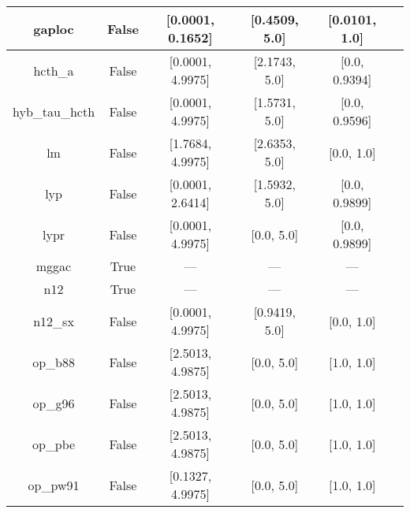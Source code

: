 \begin{tabular}{|c|c|c|c|c|l|}
         gaploc &                 False &  [0.0001, 0.1652] &     [0.4509, 5.0] &     [0.0101, 1.0] &                                         \cite{Fabiano2014_2016} \\ \hline
        hcth\_a &                 False &  [0.0001, 4.9975] &     [2.1743, 5.0] &     [0.0, 0.9394] &                                       \cite{Hamprecht1998_6264} \\ \hline
 hyb\_tau\_hcth &                 False &  [0.0001, 4.9975] &     [1.5731, 5.0] &     [0.0, 0.9596] &                                           \cite{Boese2002_9559} \\ \hline
             lm &                 False &  [1.7684, 4.9975] &     [2.6353, 5.0] &        [0.0, 1.0] &                              \cite{Langreth1981_446,Hu1985_391} \\ \hline
            lyp &                 False &  [0.0001, 2.6414] &     [1.5932, 5.0] &     [0.0, 0.9899] &                             \cite{Lee1988_785,Miehlich1989_200} \\ \hline
           lypr &                 False &  [0.0001, 4.9975] &        [0.0, 5.0] &     [0.0, 0.9899] &                                              \cite{Ai2021_1207} \\ \hline
          mggac &                  True &               --- &               --- &               --- &                                         \cite{Patra2019_155140} \\ \hline
            n12 &                  True &               --- &               --- &               --- &                                        \cite{Peverati2012_2310} \\ \hline
        n12\_sx &                 False &  [0.0001, 4.9975] &     [0.9419, 5.0] &        [0.0, 1.0] &                                       \cite{Peverati2012_16187} \\ \hline
        op\_b88 &                 False &  [2.5013, 4.9875] &        [0.0, 5.0] &        [1.0, 1.0] &                                        \cite{Tsuneda1999_10664} \\ \hline
        op\_g96 &                 False &  [2.5013, 4.9875] &        [0.0, 5.0] &        [1.0, 1.0] &                       \cite{Tsuneda1999_10664,Tsuneda1999_5656} \\ \hline
        op\_pbe &                 False &  [2.5013, 4.9875] &        [0.0, 5.0] &        [1.0, 1.0] &                       \cite{Tsuneda1999_10664,Tsuneda1999_5656} \\ \hline
       op\_pw91 &                 False &  [0.1327, 4.9975] &        [0.0, 5.0] &        [1.0, 1.0] &                       \cite{Tsuneda1999_10664,Tsuneda1999_5656} \\ \hline

\end{tabular}
